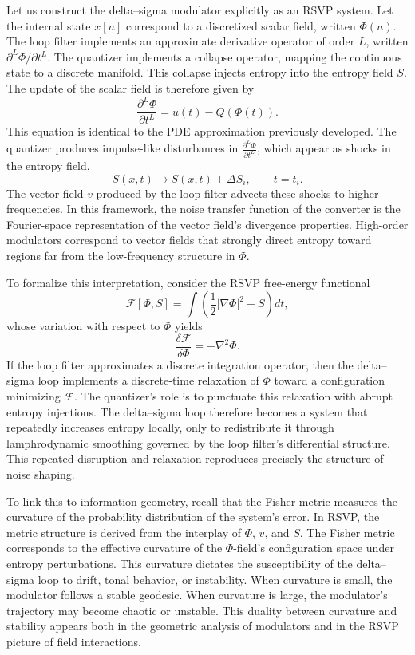 Let us construct the delta–sigma modulator explicitly as an RSVP system. Let the internal state \(x[n]\) correspond to a discretized scalar field, written \(\Phi(n)\). The loop filter implements an approximate derivative operator of order \(L\), written \(\partial^{L}\Phi / \partial t^{L}\). The quantizer implements a collapse operator, mapping the continuous state to a discrete manifold. This collapse injects entropy into the entropy field \(S\). The update of the scalar field is therefore given by
\[
\frac{\partial^{L}\Phi}{\partial t^{L}} = u(t) - Q(\Phi(t)).
\]
This equation is identical to the PDE approximation previously developed. The quantizer produces impulse-like disturbances in \(\frac{\partial^{L}\Phi}{\partial t^{L}}\), which appear as shocks in the entropy field,
\[
S(x,t) \to S(x,t) + \Delta S_{i}, \qquad t = t_{i}.
\]
The vector field \(v\) produced by the loop filter advects these shocks to higher frequencies. In this framework, the noise transfer function of the converter is the Fourier-space representation of the vector field’s divergence properties. High-order modulators correspond to vector fields that strongly direct entropy toward regions far from the low-frequency structure in \(\Phi\).

To formalize this interpretation, consider the RSVP free-energy functional
\[
\mathcal{F}[\Phi,S] = \int \left( \frac{1}{2} |\nabla \Phi|^{2} + S \right) dt,
\]
whose variation with respect to \(\Phi\) yields
\[
\frac{\delta \mathcal{F}}{\delta \Phi} = -\nabla^{2}\Phi.
\]
If the loop filter approximates a discrete integration operator, then the delta–sigma loop implements a discrete-time relaxation of \(\Phi\) toward a configuration minimizing \(\mathcal{F}\). The quantizer’s role is to punctuate this relaxation with abrupt entropy injections. The delta–sigma loop therefore becomes a system that repeatedly increases entropy locally, only to redistribute it through lamphrodynamic smoothing governed by the loop filter’s differential structure. This repeated disruption and relaxation reproduces precisely the structure of noise shaping.

To link this to information geometry, recall that the Fisher metric measures the curvature of the probability distribution of the system’s error. In RSVP, the metric structure is derived from the interplay of \(\Phi\), \(v\), and \(S\). The Fisher metric corresponds to the effective curvature of the \(\Phi\)-field’s configuration space under entropy perturbations. This curvature dictates the susceptibility of the delta–sigma loop to drift, tonal behavior, or instability. When curvature is small, the modulator follows a stable geodesic. When curvature is large, the modulator’s trajectory may become chaotic or unstable. This duality between curvature and stability appears both in the geometric analysis of modulators and in the RSVP picture of field interactions.

